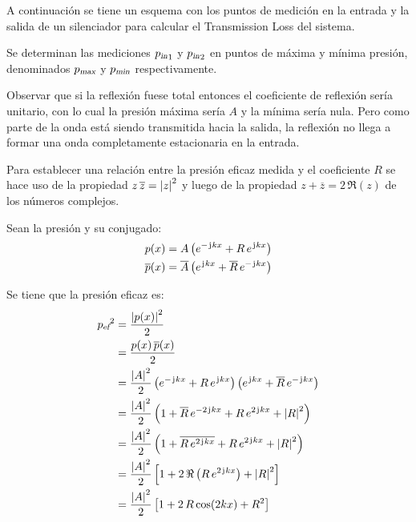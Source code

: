 \documentclass[a5paper,12pt,twoside]{book}
\begin{document}
A continuación se tiene un esquema con los puntos de medición en la entrada y la salida de un silenciador para calcular el Transmission Loss del sistema.

\begin{center}
    \def\svgwidth{0.5\linewidth}
    
\end{center}

Se determinan las mediciones ${{p}_\textsl{{in}}}_1$ y ${{p}_\textsl{{in}}}_2$ en puntos de máxima y mínima presión, denominados ${{p}_\textsl{{max}}}$ y ${{p}_\textsl{{min}}}$ respectivamente.

Observar que si la reflexión fuese total entonces el coeficiente de reflexión sería unitario, con lo cual la presión máxima sería $A$ y la mínima sería nula.
Pero como parte de la onda está siendo transmitida hacia la salida, la reflexión no llega a formar una onda completamente estacionaria en la entrada.

Para establecer una relación entre la presión eficaz medida y el coeficiente $R$ se hace uso de la propiedad $z \, \overline{z} = {\left| {z} \right|}^2$ y luego de la propiedad $z + \overline{z} = 2\,\Re(z)$ de los números complejos.

Sean la presión y su conjugado:
\begin{align*}
    p(x) &= A \left( e^{-\mkern2mu\mathrm{j}\mkern1mu k x} + R \, e^{\mkern2mu\mathrm{j}\mkern1mu k x} \right)
    \\
    \overline{p}(x) &= \overline{A} \left( e^{\mkern2mu\mathrm{j}\mkern1mu k x} + \overline{R} \, e^{-\mkern2mu\mathrm{j}\mkern1mu k x} \right)
\end{align*}

Se tiene que la presión eficaz es:
\begin{align*}
    {{{p}_\textsl{{ef}}}}^2 &= \frac{{\left| {p(x)} \right|}^2}{2}
    \\
    &= \frac{p(x) \, \overline{p}(x)}{2}
    \\
    &= \frac{{\left| {A} \right|}^2}{2} \left( e^{-\mkern2mu\mathrm{j}\mkern1mu k x} + R \, e^{\mkern2mu\mathrm{j}\mkern1mu k x} \right) \left( e^{\mkern2mu\mathrm{j}\mkern1mu k x} + \overline{R} \, e^{-\mkern2mu\mathrm{j}\mkern1mu k x} \right)
    \\
    &= \frac{{\left| {A} \right|}^2}{2} \left( 1 + \overline{R} \, e^{-2\mkern2mu\mathrm{j}\mkern1mu k x} + R \, e^{2\mkern2mu\mathrm{j}\mkern1mu k x} + {\left| {R} \right|}^2  \right)
    \\
    &= \frac{{\left| {A} \right|}^2}{2} \left( 1 + \overline{R \, e^{2\mkern2mu\mathrm{j}\mkern1mu k x}} + R \, e^{2\mkern2mu\mathrm{j}\mkern1mu k x} + {\left| {R} \right|}^2  \right)
    \\
    &= \frac{{\left| {A} \right|}^2}{2} \left[ 1 + 2\,\Re \left( R\,e^{2\mkern2mu\mathrm{j}\mkern1mu k x} \right) + {\left| {R} \right|}^2 \right]
    \\
    &= \frac{{\left| {A} \right|}^2}{2} \left[ 1 + 2 \, R \cos(2kx) + R^2 \right]
\end{align*}
\end{document}
